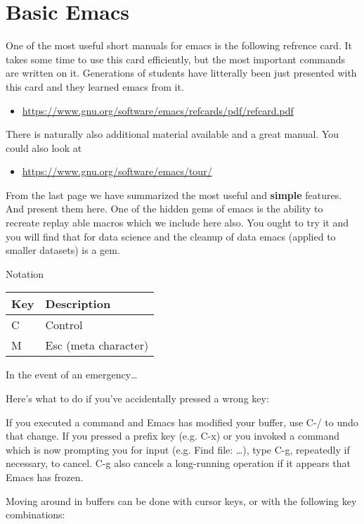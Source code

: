 \FILENAME

\section{Basic Emacs}\label{basic-emacs}

One of the most useful short manuals for emacs is the following refrence
card. It takes some time to use this card efficiently, but the most
important commands are written on it. Generations of students have
litterally been just presented with this card and they learned emacs
from it.

\begin{itemize}
\tightlist
\item
  \url{https://www.gnu.org/software/emacs/refcards/pdf/refcard.pdf}
\end{itemize}

There is naturally also additional material available and a great
manual. You could also look at

\begin{itemize}
\tightlist
\item
  \url{https://www.gnu.org/software/emacs/tour/}
\end{itemize}

From the last page we have summarized the most useful and
\textbf{simple} features. And present them here. One of the hidden gems
of emacs is the ability to recreate replay able macros which we include
here also. You ought to try it and you will find that for data science
and the cleanup of data emacs (applied to smaller datasets) is a gem.

Notation

\begin{longtable}[]{@{}ll@{}}
\toprule
Key & Description\tabularnewline
\midrule
\endhead
C & Control\tabularnewline
M & Esc (meta character)\tabularnewline
\bottomrule
\end{longtable}

In the event of an emergency\ldots{}

Here's what to do if you've accidentally pressed a wrong key:

If you executed a command and Emacs has modified your buffer, use C-/ to
undo that change. If you pressed a prefix key (e.g. C-x) or you invoked
a command which is now prompting you for input (e.g. Find file:
\ldots{}), type C-g, repeatedly if necessary, to cancel. C-g also
cancels a long-running operation if it appears that Emacs has frozen.

Moving around in buffers can be done with cursor keys, or with the
following key combinations:

